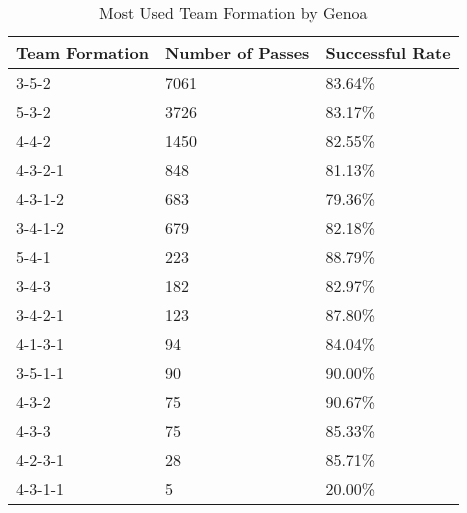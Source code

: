 \begin{table}[!htbp]
\centering
\begin{tabular}{@{}lll@{}}
\toprule
Team Formation & Number of Passes & Successful Rate \\ \midrule
3-5-2         & 7061             & 83.64\%         \\
5-3-2         & 3726             & 83.17\%         \\
4-4-2         & 1450             & 82.55\%         \\
4-3-2-1       & 848              & 81.13\%         \\
4-3-1-2       & 683              & 79.36\%         \\
3-4-1-2       & 679              & 82.18\%         \\
5-4-1         & 223              & 88.79\%         \\
3-4-3         & 182              & 82.97\%         \\
3-4-2-1       & 123              & 87.80\%         \\
4-1-3-1       & 94               & 84.04\%         \\
3-5-1-1       & 90               & 90.00\%         \\
4-3-2         & 75               & 90.67\%         \\
4-3-3         & 75               & 85.33\%         \\
4-2-3-1       & 28               & 85.71\%         \\
4-3-1-1       & 5                & 20.00\%         \\ \bottomrule
\end{tabular}
\caption{Most Used Team Formation by Genoa}
\label{tab:formation_genoa}
\end{table}